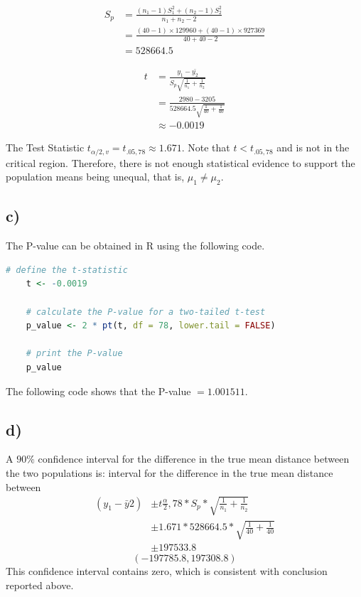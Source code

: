 \documentclass{article}
\begin{document}
\begin{align*}
    S_p &= \frac{(n_1 - 1)S_1^2 + (n_2 - 1)S_2^2}{n_1 + n_2 - 2} \\
    &= \frac{(40 - 1) \times 129960 + (40 - 1) \times 927369}{40 + 40 - 2} \\
    &= 528664.5
    \end{align*}

\begin{align*}
    t &= \frac{y_1-\bar{y_2}}{S_p \sqrt{\frac{1}{n_1}+\frac{1}{n_2}}} \\
    &= \frac{2980 - 3205}{528664.5 \sqrt{\frac{1}{40}+\frac{1}{40}}} \\
    &\approx -0.0019
    \end{align*}

The Test Statistic $t_{\alpha / 2 , v} = t_{.05 , 78} \approx 1.671$. Note that $t < t_{.05 , 78}$ and is not in the critical region.
Therefore, there is not enough statistical evidence to support the population means being unequal, that is, $\mu_1 \neq \mu_2$. 

\subsection*{c)}
The P-value can be obtained in R using the following code.
\begin{lstlisting}[language=R, caption=Calculating the P-value for a $t$ value, basicstyle=\small]
    # define the t-statistic
    t <- -0.0019
    
    # calculate the P-value for a two-tailed t-test
    p_value <- 2 * pt(t, df = 78, lower.tail = FALSE)
    
    # print the P-value
    p_value
    \end{lstlisting}

The following code shows that the P-value $= 1.001511$.
\subsection*{d)}
A $90\%$ confidence interval for the difference in the true mean distance between
the two populations is:
interval for the difference in the true mean distance between
\begin{align*}
    (y_1-\bar{y}2)&\pm t{\frac{\alpha}{2}, 78} * S_p * \sqrt{\frac{1}{n_1} + \frac{1}{n_2}} \\
    &\pm 1.671 * 528664.5 * \sqrt{\frac{1}{40} + \frac{1}{40}} \\
    &\pm 197533.8
    \end{align*}
\begin{equation*}
    (-197785.8, 197308.8)
\end{equation*}
This confidence interval contains zero, which is consistent with conclusion reported above.
\end{document}
